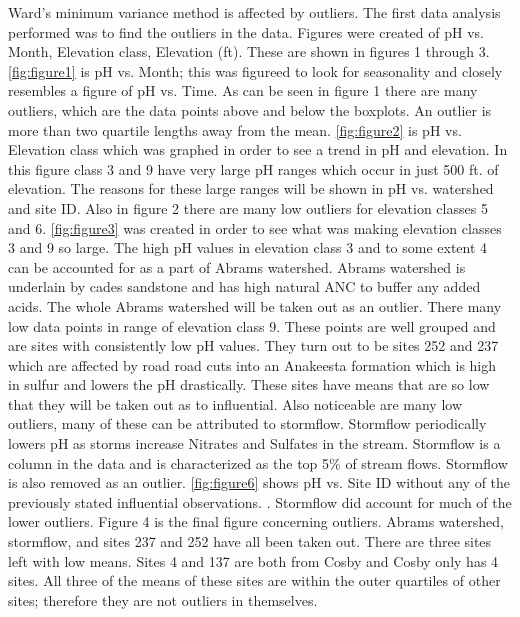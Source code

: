\documentclass[11pt]{article} %
\begin{document}
Ward’s minimum variance method is affected by outliers.  The first data analysis performed was to find the outliers in the data.  Figures were created of pH vs. Month, Elevation class, Elevation (ft).  These are shown in figures 1 through 3.   \autoref{fig:figure1} is pH vs. Month; this was figureed to look for seasonality and closely resembles a figure of pH vs. Time.  As can be seen in figure 1 there are many outliers, which are the data points above and below the boxplots.  An outlier is more than two quartile lengths away from the mean. \autoref{fig:figure2} is pH vs. Elevation class which was graphed in order to see a trend in pH and elevation.  In this figure class 3 and 9 have very large pH ranges which occur in just 500 ft. of elevation.  The reasons for these large ranges will be shown in pH vs. watershed and site ID.  Also in figure 2 there are many low outliers for elevation classes 5 and 6.  \autoref{fig:figure3} was created in order to see what was making elevation classes 3 and 9 so large.  The high pH values in elevation class 3 and to some extent 4 can be accounted for as a part of Abrams watershed.  Abrams watershed is underlain by cades sandstone and has high natural ANC to buffer any added acids.  The whole Abrams watershed will be taken out as an outlier.  There many low data points in range of elevation class 9.  These points are well grouped and are sites with consistently low pH values.  They turn out to be sites 252 and 237 which are affected by road road cuts into an Anakeesta formation which is high in sulfur and  lowers the pH drastically.  These sites have means that are so low that they will be taken out as to influential.    Also noticeable are many low outliers, many of these can be attributed to stormflow.  Stormflow periodically lowers pH as storms increase Nitrates and Sulfates in the stream.  Stormflow is a column in the data and is characterized as the top 5$\%$ of stream flows.  Stormflow is also removed as an outlier. \autoref{fig:figure6} shows pH vs. Site ID without any of the previously stated influential observations.  .  Stormflow did account for much of the lower outliers.  Figure 4 is the final figure concerning outliers.  Abrams watershed, stormflow, and sites 237 and 252 have all been taken out.  There are three sites left with low means.  Sites 4 and 137 are both from Cosby and Cosby only has 4 sites.  All three of the means of these sites are within the outer quartiles of other sites; therefore they are not outliers in themselves.
	
\end{document}
